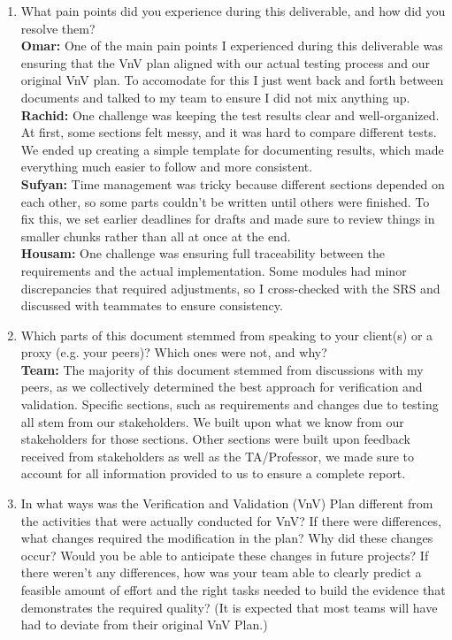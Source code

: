 \documentclass[12pt, titlepage]{article}
\begin{document}
\begin{enumerate}
  \item What pain points did you experience during this deliverable, and how
    did you resolve them? \\
    \textbf{Omar:} One of the main pain points I experienced during this deliverable was ensuring that the VnV plan aligned with our actual testing process and our original VnV plan. To accomodate for this I just went back and forth between documents and talked to my team to ensure I did not mix anything up. \\
    \textbf{Rachid:} One challenge was keeping the test results clear and well-organized. At first, some sections felt messy, and it was hard to compare different tests. We ended up creating a simple template for documenting results, which made everything much easier to follow and more consistent. \\
    \textbf{Sufyan:} Time management was tricky because different sections depended on each other, so some parts couldn't be written until others were finished. To fix this, we set earlier deadlines for drafts and made sure to review things in smaller chunks rather than all at once at the end.\\
    \textbf{Housam:} One challenge was ensuring full traceability between the requirements and the actual implementation. Some modules had minor discrepancies that required adjustments, so I cross-checked with the SRS and discussed with teammates to ensure consistency.\\

    

  \item Which parts of this document stemmed from speaking to your client(s) or
  a proxy (e.g. your peers)? Which ones were not, and why? \\
    \textbf{Team:} The majority of this document stemmed from discussions with my peers, as we collectively determined the best approach for verification and validation. Specific sections, such as requirements and changes due to testing all stem from our stakeholders. We built upon what we know from our stakeholders for those sections. Other sections were built upon feedback received from stakeholders as well as the TA/Professor, we made sure to account for all information provided to us to ensure a complete report. 

  \item In what ways was the Verification and Validation (VnV) Plan different
  from the activities that were actually conducted for VnV?  If there were
  differences, what changes required the modification in the plan?  Why did
  these changes occur?  Would you be able to anticipate these changes in future
  projects?  If there weren't any differences, how was your team able to clearly
  predict a feasible amount of effort and the right tasks needed to build the
  evidence that demonstrates the required quality?  (It is expected that most
  teams will have had to deviate from their original VnV Plan.) \\


\end{enumerate}
\end{document}
